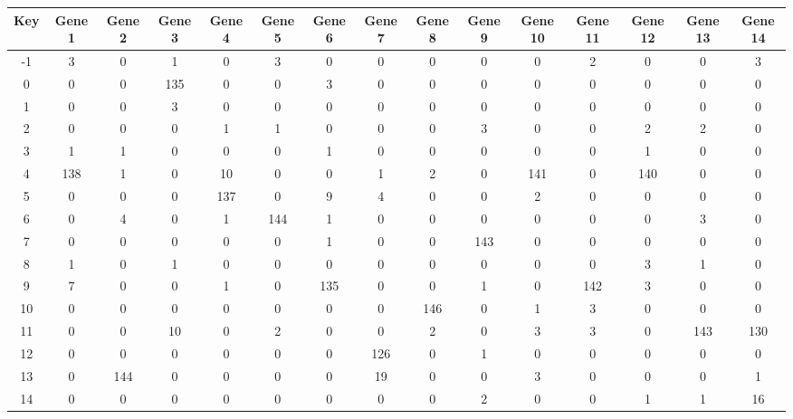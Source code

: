 \begin{tabular}{|c|c|c|c|c|c|c|c|c|c|c|c|c|c|c|}
\hline
Key & Gene 1 & Gene 2 & Gene 3 & Gene 4 & Gene 5 & Gene 6 & Gene 7 & Gene 8 & Gene 9 & Gene 10 & Gene 11 & Gene 12 & Gene 13 & Gene 14 \\
\hline
-1 & 3 & 0 & 1 & 0 & 3 & 0 & 0 & 0 & 0 & 0 & 2 & 0 & 0 & 3 \\
0 & 0 & 0 & 135 & 0 & 0 & 3 & 0 & 0 & 0 & 0 & 0 & 0 & 0 & 0 \\
1 & 0 & 0 & 3 & 0 & 0 & 0 & 0 & 0 & 0 & 0 & 0 & 0 & 0 & 0 \\
2 & 0 & 0 & 0 & 1 & 1 & 0 & 0 & 0 & 3 & 0 & 0 & 2 & 2 & 0 \\
3 & 1 & 1 & 0 & 0 & 0 & 1 & 0 & 0 & 0 & 0 & 0 & 1 & 0 & 0 \\
4 & 138 & 1 & 0 & 10 & 0 & 0 & 1 & 2 & 0 & 141 & 0 & 140 & 0 & 0 \\
5 & 0 & 0 & 0 & 137 & 0 & 9 & 4 & 0 & 0 & 2 & 0 & 0 & 0 & 0 \\
6 & 0 & 4 & 0 & 1 & 144 & 1 & 0 & 0 & 0 & 0 & 0 & 0 & 3 & 0 \\
7 & 0 & 0 & 0 & 0 & 0 & 1 & 0 & 0 & 143 & 0 & 0 & 0 & 0 & 0 \\
8 & 1 & 0 & 1 & 0 & 0 & 0 & 0 & 0 & 0 & 0 & 0 & 3 & 1 & 0 \\
9 & 7 & 0 & 0 & 1 & 0 & 135 & 0 & 0 & 1 & 0 & 142 & 3 & 0 & 0 \\
10 & 0 & 0 & 0 & 0 & 0 & 0 & 0 & 146 & 0 & 1 & 3 & 0 & 0 & 0 \\
11 & 0 & 0 & 10 & 0 & 2 & 0 & 0 & 2 & 0 & 3 & 3 & 0 & 143 & 130 \\
12 & 0 & 0 & 0 & 0 & 0 & 0 & 126 & 0 & 1 & 0 & 0 & 0 & 0 & 0 \\
13 & 0 & 144 & 0 & 0 & 0 & 0 & 19 & 0 & 0 & 3 & 0 & 0 & 0 & 1 \\
14 & 0 & 0 & 0 & 0 & 0 & 0 & 0 & 0 & 2 & 0 & 0 & 1 & 1 & 16 \\
\hline
\end{tabular}
